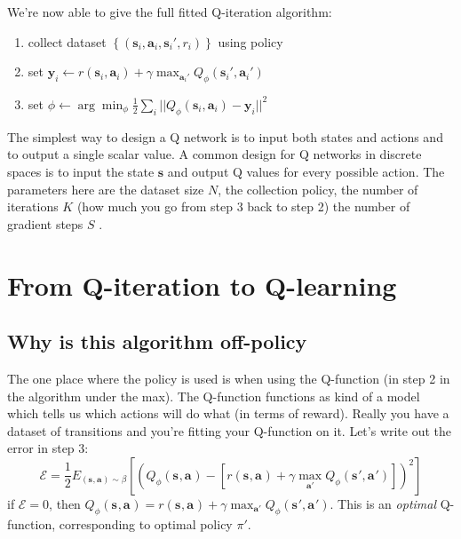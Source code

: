\documentclass{report}
\newcommand{\argmin}{\arg\!\min}
\begin{document}
We're now able to give the full fitted Q-iteration algorithm:
\begin{enumerate}
		\label{eq:fitted_q_iteration_algorithm}
		\item collect dataset $ \left\{ \left( \bm{s}_i, \bm{a}_i, \bm{s}_i', r_i \right)  \right\}  $ using policy
		\item set $ \bm{y}_i \leftarrow r(\bm{s}_{i}, \bm{a}_{i})+ \gamma \max_{\bm{a}_i'} Q_\phi (\bm{s}_{i}', \bm{a}_{i}')   $
		\item set $\phi \leftarrow \argmin_\phi \frac{1}{2} \sum_{i}^{} || Q_\phi (\bm{s}_{i}, \bm{a}_{i}) - \bm{y}_i||^2 $
\end{enumerate}
The simplest way to design a Q network is to input both states and actions and to output a single scalar value.
A common design for Q networks in discrete spaces is to input the state $\bm{s}$ and output Q values for every possible action.
The parameters here are the dataset size $N$, the collection policy, 
the number of iterations $K$ (how much you go from step 3 back to step 2) the number of gradient steps $S$ .

\section{From Q-iteration to Q-learning}
\subsection{Why is this algorithm off-policy}
The one place where the policy is used is when using the Q-function (in step 2 in the algorithm under the max).
The Q-function functions as kind of a model which tells us which actions will do what (in terms of reward).
Really you have a dataset of transitions and you're fitting your Q-function on it.
Let's write out the error in step 3:
\begin{equation}
		\mathcal{E} = \frac{1}{2} E_{(\bm{s}_{}, \bm{a}_{}) \sim \beta}
		\left[ \left( Q_\phi (\bm{s}_{}, \bm{a}_{}) - \left[ r(\bm{s}_{}, \bm{a}_{}) + \gamma \max_{\bm{a}'}Q_\phi(\bm{s}_{}', \bm{a}_{}')  \right]  \right)^2  \right] 
\end{equation}
if $\mathcal{E} =0 $, then $ Q_\phi(\bm{s}_{}, \bm{a}_{}) = r(\bm{s}_{}, \bm{a}_{}) + \gamma \max_{\bm{a}'}Q_\phi(\bm{s}_{}', \bm{a}_{}')$.
This is an \textit{optimal} Q-function, corresponding to optimal policy $\pi'$.
\end{document}
